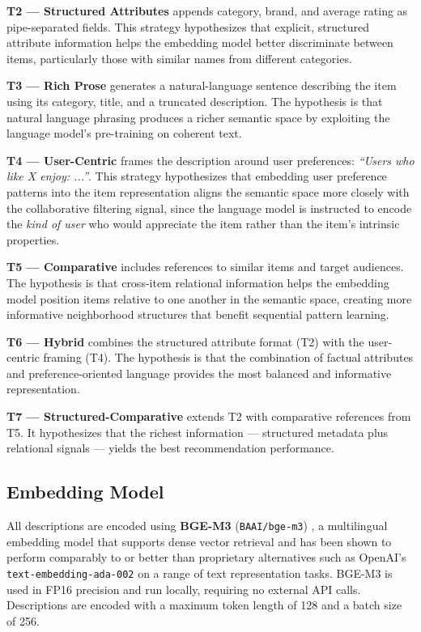 \documentclass[12pt,a4paper]{report}
\begin{document}
\textbf{T2 — Structured Attributes} appends category, brand, and average rating
as pipe-separated fields. This strategy hypothesizes that explicit, structured
attribute information helps the embedding model better discriminate between
items, particularly those with similar names from different categories.

\textbf{T3 — Rich Prose} generates a natural-language sentence describing the
item using its category, title, and a truncated description. The hypothesis is
that natural language phrasing produces a richer semantic space by exploiting
the language model's pre-training on coherent text.

\textbf{T4 — User-Centric} frames the description around user preferences:
\textit{``Users who like X enjoy: ...''}. This strategy hypothesizes that
embedding user preference patterns into the item representation aligns the
semantic space more closely with the collaborative filtering signal, since the
language model is instructed to encode the \emph{kind of user} who would
appreciate the item rather than the item's intrinsic properties.

\textbf{T5 — Comparative} includes references to similar items and target
audiences. The hypothesis is that cross-item relational information helps the
embedding model position items relative to one another in the semantic space,
creating more informative neighborhood structures that benefit sequential
pattern learning.

\textbf{T6 — Hybrid} combines the structured attribute format (T2) with the
user-centric framing (T4). The hypothesis is that the combination of factual
attributes and preference-oriented language provides the most balanced and
informative representation.

\textbf{T7 — Structured-Comparative} extends T2 with comparative references
from T5. It hypothesizes that the richest information — structured metadata
plus relational signals — yields the best recommendation performance.

\subsection*{Embedding Model}

All descriptions are encoded using \textbf{BGE-M3}
(\texttt{BAAI/bge-m3}) \citep{chen2024bge}, a multilingual embedding model that
supports dense vector retrieval and has been shown to perform comparably to or
better than proprietary alternatives such as OpenAI's \texttt{text-embedding-ada-002}
on a range of text representation tasks. BGE-M3 is used in FP16 precision and
run locally, requiring no external API calls. Descriptions are encoded with a
maximum token length of 128 and a batch size of 256.
\end{document}
